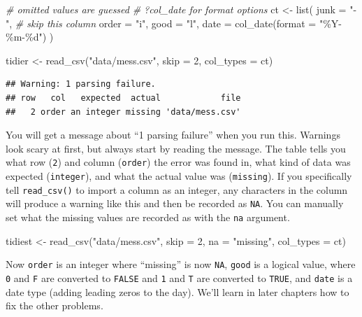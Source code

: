 \documentclass[
  oneside]{book}
\newenvironment{Shaded}{\begin{snugshade}}{\end{snugshade}}
\newcommand{\AttributeTok}[1]{\textcolor[rgb]{0.77,0.63,0.00}{#1}}
\newcommand{\CommentTok}[1]{\textcolor[rgb]{0.56,0.35,0.01}{\textit{#1}}}
\newcommand{\DecValTok}[1]{\textcolor[rgb]{0.00,0.00,0.81}{#1}}
\newcommand{\FunctionTok}[1]{\textcolor[rgb]{0.00,0.00,0.00}{#1}}
\newcommand{\NormalTok}[1]{#1}
\newcommand{\OtherTok}[1]{\textcolor[rgb]{0.56,0.35,0.01}{#1}}
\newcommand{\StringTok}[1]{\textcolor[rgb]{0.31,0.60,0.02}{#1}}
\begin{document}
\begin{Shaded}
\begin{Highlighting}[]
\CommentTok{\# omitted values are guessed}
\CommentTok{\# ?col\_date for format options}
\NormalTok{ct }\OtherTok{\textless{}{-}} \FunctionTok{list}\NormalTok{(}
  \AttributeTok{junk =} \StringTok{"{-}"}\NormalTok{, }\CommentTok{\# skip this column}
  \AttributeTok{order =} \StringTok{"i"}\NormalTok{,}
  \AttributeTok{good =} \StringTok{"l"}\NormalTok{,}
  \AttributeTok{date =} \FunctionTok{col\_date}\NormalTok{(}\AttributeTok{format =} \StringTok{"\%Y{-}\%m{-}\%d"}\NormalTok{)}
\NormalTok{)}

\NormalTok{tidier }\OtherTok{\textless{}{-}} \FunctionTok{read\_csv}\NormalTok{(}\StringTok{"data/mess.csv"}\NormalTok{, }
                   \AttributeTok{skip =} \DecValTok{2}\NormalTok{,}
                   \AttributeTok{col\_types =}\NormalTok{ ct)}
\end{Highlighting}
\end{Shaded}

\begin{verbatim}
## Warning: 1 parsing failure.
## row   col   expected  actual            file
##   2 order an integer missing 'data/mess.csv'
\end{verbatim}

You will get a message about ``1 parsing failure'' when you run this. Warnings look scary at first, but always start by reading the message. The table tells you what row (\texttt{2}) and column (\texttt{order}) the error was found in, what kind of data was expected (\texttt{integer}), and what the actual value was (\texttt{missing}). If you specifically tell \texttt{read\_csv()} to import a column as an integer, any characters in the column will produce a warning like this and then be recorded as \texttt{NA}. You can manually set what the missing values are recorded as with the \texttt{na} argument.

\begin{Shaded}
\begin{Highlighting}[]
\NormalTok{tidiest }\OtherTok{\textless{}{-}} \FunctionTok{read\_csv}\NormalTok{(}\StringTok{"data/mess.csv"}\NormalTok{, }
                   \AttributeTok{skip =} \DecValTok{2}\NormalTok{,}
                   \AttributeTok{na =} \StringTok{"missing"}\NormalTok{,}
                   \AttributeTok{col\_types =}\NormalTok{ ct)}
\end{Highlighting}
\end{Shaded}

Now \texttt{order} is an integer where ``missing'' is now \texttt{NA}, \texttt{good} is a logical value, where \texttt{0} and \texttt{F} are converted to \texttt{FALSE} and \texttt{1} and \texttt{T} are converted to \texttt{TRUE}, and \texttt{date} is a date type (adding leading zeros to the day). We'll learn in later chapters how to fix the other problems.
\end{document}
